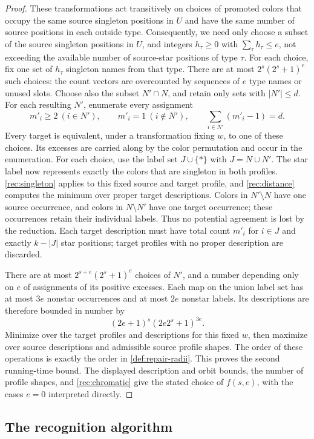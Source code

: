 \documentclass[11pt,reqno]{amsart}
\numberwithin{equation}{section}
\theoremstyle{definition}
\theoremstyle{remark}
\begin{document}
\begin{proof}
These transformations act transitively on choices of promoted colors
that occupy the same source singleton positions in $U$ and have the
same number of source positions in each outside type. Consequently,
we need only choose a subset of the source singleton positions in
$U$, and integers $h_\tau\geq0$ with $\sum_\tau h_\tau\leq e$,
not exceeding the available number of source-star positions of type
$\tau$. For each choice, fix one set of $h_\tau$ singleton
names from that type. There are at most
$2^s(2^s+1)^e$ such choices: the count vectors are overcounted
by sequences of $e$ type names or unused slots.
Choose also the subset $N'\cap N$, and retain only sets with
$|N'|\leq d$. For each resulting $N'$, enumerate every assignment
\[
m'_i\geq2\ (i\in N'),\qquad m'_i=1\ (i\notin N'),\qquad
\sum_{i\in N'}(m'_i-1)=d.
\]
Every target is equivalent, under a transformation fixing $w$,
to one of these choices. Its excesses are carried along by the
color permutation and occur in the enumeration. For each choice, use the
label set $J\cup\{*\}$ with $J=N\cup N'$. The star label now
represents exactly the colors that are singleton in both profiles.
\cref{rec:singleton} applies to this fixed source and target
profile, and \cref{rec:distance} computes the minimum over
proper target descriptions. Colors in $N'\setminus N$ have one
source occurrence, and colors in $N\setminus N'$ have one target
occurrence; these occurrences retain their individual labels.
Thus no potential agreement is lost by the reduction. Each target
description must have total count $m'_i$ for $i\in J$ and exactly
$k-|J|$ star positions; target profiles with no proper description
are discarded.

There are at most $2^{s+e}(2^s+1)^e$ choices of $N'$, and a number
depending only on $e$ of assignments of its positive excesses.
Each map on the union label set has at most $3e$ nonstar
occurrences and at most $2e$ nonstar labels. Its descriptions are
therefore bounded in number by
\[
(2e+1)^s(2e2^s+1)^{3e}.
\]
Minimize over the target profiles and descriptions for this fixed
$w$, then maximize over source descriptions and admissible source
profile shapes. The order of these operations is exactly the
order in \cref{def:repair-radii}. This proves the second
running-time bound. The displayed description and orbit bounds, the number
of profile shapes, and \cref{rec:chromatic} give the stated
choice of $f(s,e)$, with the cases $e=0$ interpreted directly.
\end{proof}

\subsection{The recognition algorithm}
\end{document}
